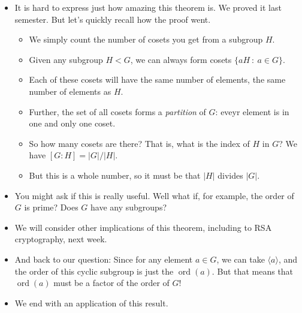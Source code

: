 \documentclass[12pt]{article}
\theoremstyle{plain}
\theoremstyle{definition}
\theoremstyle{remark}
\def\st{~:~}
\DeclareMathOperator{\ord}{ord}
\begin{document}
\begin{itemize}
    \item It is hard to express just how amazing this theorem is.  We proved it last semester.  But let's quickly recall how the proof went.
    
    \begin{itemize}
      \item We simply count the number of cosets you get from a subgroup $H$. 
      \item Given any subgroup $H < G$, we can always form cosets $\{aH \st a \in G\}$.    
      \item Each of these cosets will have the same number of elements, the same number of elements as $H$.
      \item Further, the set of all cosets forms a \emph{partition} of $G$: eveyr element is in one and only one coset.
      \item So how many cosets are there?  That is, what is the index of $H$ in $G$?  We have $[G:H] = |G|/|H|$. 
      \item But this is a whole number, so it must be that $|H|$ divides $|G|$.
    \end{itemize}
    
  
    \item You might ask if this is really useful.  Well what if, for example, the order of $G$ is prime?  Does $G$ have any subgroups?
    
    \item We will consider other implications of this theorem, including to RSA cryptography, next week.
  
    \item And back to our question: Since for any element $a \in G$, we can take $\langle a\rangle$, and the order of this cyclic subgroup is just the $\ord(a)$.  But that means that $\ord(a)$ must be a factor of the order of $G$! 
    \item We end with an application of this result.
\end{itemize}
\end{document}
